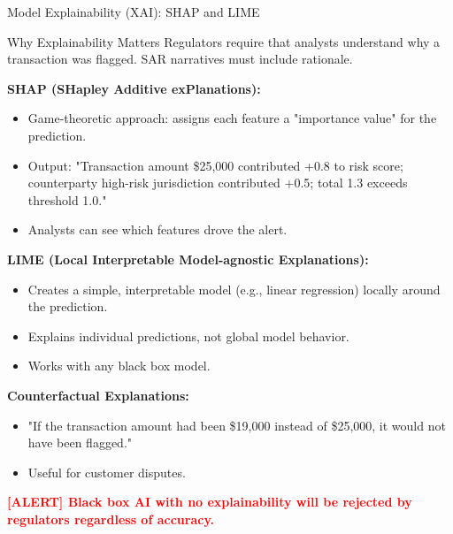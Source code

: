 \documentclass[11pt,a4paper]{beamer}
\newcommand{\redflag}[1]{\textcolor{red}{\textbf{[ALERT] #1}}}
\begin{document}
\begin{frame}{Model Explainability (XAI): SHAP and LIME}
	\begin{block}{Why Explainability Matters}
		Regulators require that analysts understand why a transaction was flagged. SAR narratives must include rationale.
	\end{block}
	\textbf{SHAP (SHapley Additive exPlanations):}
	\begin{itemize}
		\item Game-theoretic approach: assigns each feature a "importance value" for the prediction.
		\item Output: "Transaction amount \$25,000 contributed +0.8 to risk score; counterparty high-risk jurisdiction contributed +0.5; total 1.3 exceeds threshold 1.0."
		\item Analysts can see which features drove the alert.
	\end{itemize}
	\textbf{LIME (Local Interpretable Model-agnostic Explanations):}
	\begin{itemize}
		\item Creates a simple, interpretable model (e.g., linear regression) locally around the prediction.
		\item Explains individual predictions, not global model behavior.
		\item Works with any black box model.
	\end{itemize}
	\textbf{Counterfactual Explanations:}
	\begin{itemize}
		\item "If the transaction amount had been \$19,000 instead of \$25,000, it would not have been flagged."
		\item Useful for customer disputes.
	\end{itemize}
	\redflag{Black box AI with no explainability will be rejected by regulators regardless of accuracy.}
\end{frame}
\end{document}
